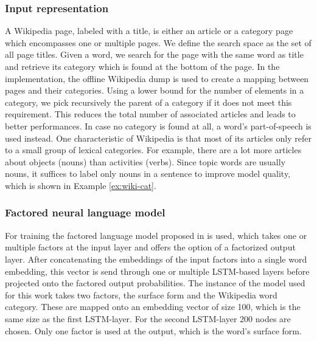 \documentclass[a4paper]{article}
\begin{document}
\subsubsection{Input representation}
A Wikipedia page, labeled with a title, is either an article or a category page which encompasses one or multiple pages.
We define the search space as the set of all page titles. Given a word, we search for the page with the same word as title and retrieve its category which is found at the bottom of the page.
In the implementation, the offline Wikipedia dump is used to create a mapping between pages and their categories. Using a lower bound for the number of elements in a category, we pick recursively the parent of a category if it does not meet this requirement. This reduces the total number of associated articles and leads to better performances. In case no category is found at all, a word's part-of-speech is used instead.
One characteristic of Wikipedia is that most of its articles only refer to a small group of lexical categories. For example, there are a lot more articles about objects (nouns) than activities (verbs). Since topic words are usually nouns, it suffices to label only nouns in a sentence to improve model quality, which is shown in Example \ref{ex:wiki-cat}.

\subsubsection{Factored neural language model}
For training the factored language model proposed in \cite{niehuesusing} is used, which takes one or multiple factors at the input layer and offers the option of a factorized output layer. After concatenating the embeddings of the input factors into a single word embedding, this vector is send through one or multiple LSTM-based layers \cite{hochreiter1997long} before projected onto the factored output probabilities. The instance of the model used for this work takes two factors, the surface form and the Wikipedia word category. These are mapped onto an embedding vector of size 100, which is the same size as the first LSTM-layer. For the second LSTM-layer 200 nodes are chosen. Only one factor is used at the output, which is the word's surface form.
\end{document}
